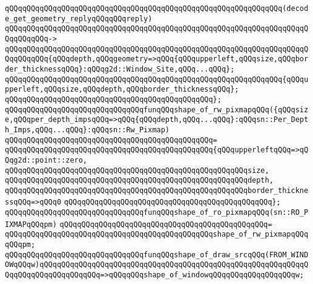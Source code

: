 \verb|qQQqqQQqqQQqqQQqqQQqqQQqqQQqqQQqqQQqqQQqqQQqqQQqqQQqqQQqqQQqqQQq(decode_get_geometry_replyqQQqqQQqreply)|\newline
\verb|qQQqqQQqqQQqqQQqqQQqqQQqqQQqqQQqqQQqqQQqqQQqqQQqqQQqqQQqqQQqqQQqqQQqqQQqqQQqqQQq->|\newline
\verb|qQQqqQQqqQQqqQQqqQQqqQQqqQQqqQQqqQQqqQQqqQQqqQQqqQQqqQQqqQQqqQQqqQQqqQQqqQQqqQQq{qQQqdepth,qQQqgeometry=>qQQq{qQQqupperleft,qQQqsize,qQQqborder_thicknessqQQq}:qQQqg2d::Window_Site,qQQq...qQQq};|\newline
\newline
\verb|qQQqqQQqqQQqqQQqqQQqqQQqqQQqqQQqqQQqqQQqqQQqqQQqqQQqqQQqqQQqqQQq{qQQqupperleft,qQQqsize,qQQqdepth,qQQqborder_thicknessqQQq};|\newline
\verb|qQQqqQQqqQQqqQQqqQQqqQQqqQQqqQQqqQQqqQQqqQQqqQQq};|\newline
\newline
\verb|qQQqqQQqqQQqqQQqqQQqqQQqqQQqqQQqfunqQQqshape_of_rw_pixmapqQQq({qQQqsize,qQQqper_depth_impsqQQq=>qQQq{qQQqdepth,qQQq...qQQq}:qQQqsn::Per_Depth_Imps,qQQq...qQQq}:qQQqsn::Rw_Pixmap)|\newline
\verb|qQQqqQQqqQQqqQQqqQQqqQQqqQQqqQQqqQQqqQQqqQQqqQQq=|\newline
\verb|qQQqqQQqqQQqqQQqqQQqqQQqqQQqqQQqqQQqqQQqqQQqqQQq{qQQqupperleftqQQq=>qQQqg2d::point::zero,|\newline
\verb|qQQqqQQqqQQqqQQqqQQqqQQqqQQqqQQqqQQqqQQqqQQqqQQqqQQqqQQqsize,|\newline
\verb|qQQqqQQqqQQqqQQqqQQqqQQqqQQqqQQqqQQqqQQqqQQqqQQqqQQqqQQqdepth,|\newline
\verb|qQQqqQQqqQQqqQQqqQQqqQQqqQQqqQQqqQQqqQQqqQQqqQQqqQQqqQQqborder_thicknessqQQq=>qQQq0|\newline
\verb|qQQqqQQqqQQqqQQqqQQqqQQqqQQqqQQqqQQqqQQqqQQqqQQq};|\newline
\newline
\verb|qQQqqQQqqQQqqQQqqQQqqQQqqQQqqQQqfunqQQqshape_of_ro_pixmapqQQq(sn::RO_PIXMAPqQQqpm)|\newline
\verb|qQQqqQQqqQQqqQQqqQQqqQQqqQQqqQQqqQQqqQQqqQQqqQQq=|\newline
\verb|qQQqqQQqqQQqqQQqqQQqqQQqqQQqqQQqqQQqqQQqqQQqqQQqshape_of_rw_pixmapqQQqqQQqpm;|\newline
\newline
\verb|qQQqqQQqqQQqqQQqqQQqqQQqqQQqqQQqfunqQQqshape_of_draw_srcqQQq(FROM_WINDOWqQQqw)qQQqqQQqqQQqqQQqqQQqqQQqqQQqqQQqqQQqqQQqqQQqqQQqqQQqqQQqqQQqqQQqqQQqqQQqqQQqqQQqqQQq=>qQQqqQQqshape_of_windowqQQqqQQqqQQqqQQqqQQqw;|\newline
